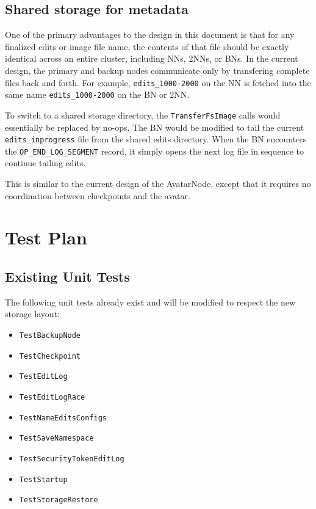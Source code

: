 \documentclass{article}
\begin{document}
\subsection{Shared storage for metadata}

One of the primary advantages to the design in this document is that for any finalized edits or image file name, the contents of that file should be exactly identical across an entire cluster, including NNs, 2NNs, or BNs. In the current design, the primary and backup nodes communicate only by transfering complete files back and forth. For example, {\tt edits\_1000-2000} on the NN is fetched into the same name {\tt edits\_1000-2000} on the BN or 2NN.

  To switch to a shared storage directory, the {\tt TransferFsImage} calls would essentially be replaced by no-ops. The BN would be modified to tail the current {\tt edits\_inprogress} file from the shared edits directory. When the BN encounters the {\tt OP\_END\_LOG\_SEGMENT} record, it simply opens the next log file in sequence to continue tailing edits.

This is similar to the current design of the AvatarNode, except that it requires no coordination between checkpoints and the avatar.

\section{Test Plan}

\subsection{Existing Unit Tests}

The following unit tests already exist and will be modified to respect the new storage layout:
\begin{itemize}
\item {\tt TestBackupNode}
\item {\tt TestCheckpoint}
\item {\tt TestEditLog}
\item {\tt TestEditLogRace}
\item {\tt TestNameEditsConfigs}
\item {\tt TestSaveNamespace}
\item {\tt TestSecurityTokenEditLog}
\item {\tt TestStartup}
\item {\tt TestStorageRestore}
\end{itemize}
\end{document}
